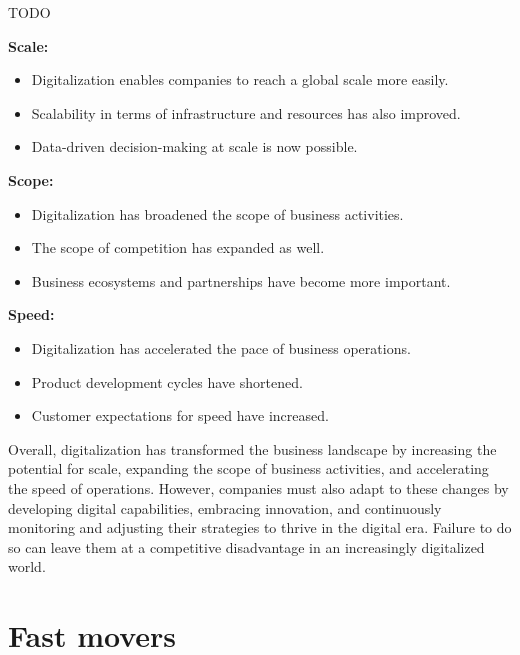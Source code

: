 \documentclass[a4]{scrartcl}
\begin{document}
	
	
	TODO
	
	
	\textbf{Scale:}
	\begin{itemize}
		\item Digitalization enables companies to reach a global scale more easily.
		\item Scalability in terms of infrastructure and resources has also improved.
		\item Data-driven decision-making at scale is now possible.
	\end{itemize}
	
	
	\textbf{Scope:}
	\begin{itemize}
		\item Digitalization has broadened the scope of business activities.
		\item The scope of competition has expanded as well.
		\item Business ecosystems and partnerships have become more important.
	\end{itemize}
	
	
	\textbf{Speed:}
	\begin{itemize}
		\item Digitalization has accelerated the pace of business operations.
		\item Product development cycles have shortened.
		\item Customer expectations for speed have increased.
	\end{itemize}
	
	Overall, digitalization has transformed the business landscape by increasing the potential for scale, expanding the scope of business activities, and accelerating the speed of operations. However, companies must also adapt to these changes by developing digital capabilities, embracing innovation, and continuously monitoring and adjusting their strategies to thrive in the digital era. Failure to do so can leave them at a competitive disadvantage in an increasingly digitalized world.
	
	
	
	
	
	
	
	
	
	\section{Fast movers}
	
	
\end{document}
